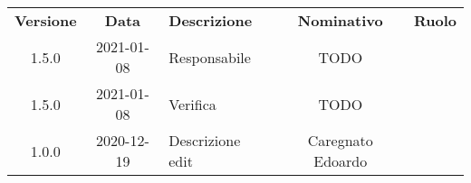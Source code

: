 {
    \renewcommand{\arraystretch}{1.5}
    \centering
    \begin{longtable}{ c c  C{4cm}  c  c }
        \rowcolor{\primaryColor}
        \textcolor{\secondaryColor}{
        \textbf{Versione}}     & \textcolor{\secondaryColor}{\textbf{Data}}       & \textcolor{\secondaryColor}
        {\textbf{Descrizione}} & \textcolor{\secondaryColor}{\textbf{Nominativo}} & \textcolor{\secondaryColor}{\textbf{Ruolo}}                          \\


        1.5.0                  & 2021-01-08                                       & Responsabile                                & TODO & \responsabile{} \\
        1.5.0                  & 2021-01-08                                      & Verifica                                    & TODO & \verificatore{} \\
        1.0.0                  & 2020-12-19                                       & Descrizione edit                            & Caregnato Edoardo & \redattore{}    \\
    \end{longtable}
}